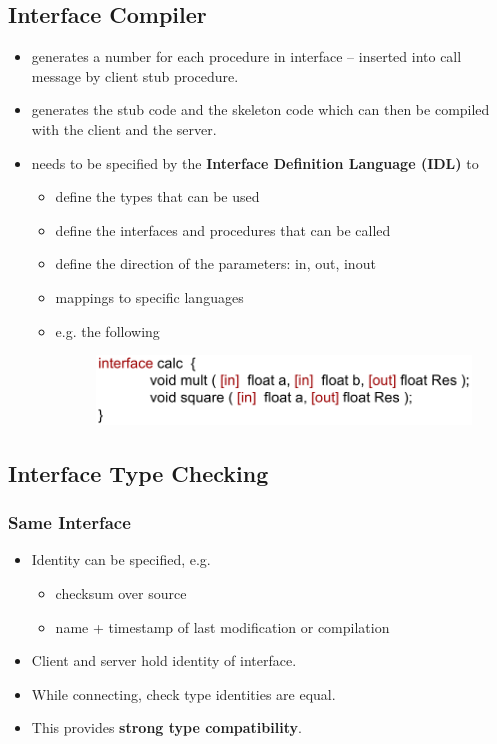 \documentclass[twocolumn,landscape,10pt]{article}
\theoremstyle{definition}
\begin{document}
\subsection{Interface Compiler}
\begin{itemize}
    \item generates a number for each procedure in interface 
        -- inserted into call message by client stub procedure.
    \item generates the stub code and the skeleton code which can then
        be compiled with the client and the server.
    \item needs to be specified by the \textbf{Interface Definition
        Language (IDL)} to
        \begin{itemize}
            \item define the types that can be used
            \item define the interfaces and procedures that can be
                called
            \item define the direction of the parameters: in, out, inout
            \item mappings to specific languages
            \item e.g. the following
                \begin{figure}[h]
                    \includegraphics[scale=0.3]{IDL.png}
                    \centering
                \end{figure}
        \end{itemize} 
\end{itemize} 

\subsection{Interface Type Checking}

\subsubsection{Same Interface}

\begin{itemize}
    \item Identity can be specified, e.g.
        \begin{itemize}
            \item checksum over source
            \item name + timestamp of last modification or compilation
        \end{itemize} 
    \item  Client and server hold identity of interface.
    \item While connecting, check type identities are equal.
    \item This provides \textbf{strong type compatibility}.
\end{itemize} 
\end{document}
